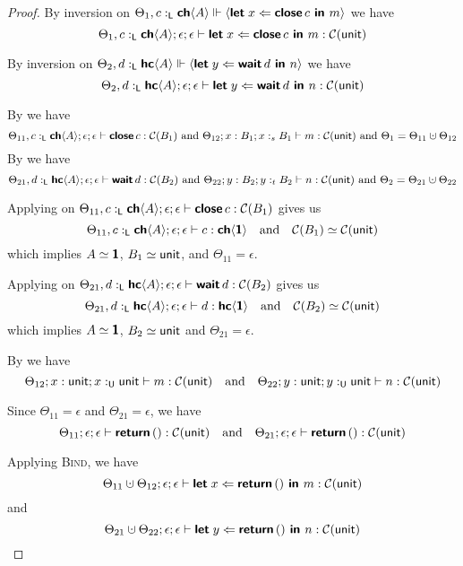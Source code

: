 \begin{proof}
  \noindent
  By inversion on $\Theta_1, c :_{\textsf{L}} {\textbf{\textsf{ch}}\langle{A}\rangle} \Vdash {\langle{\textbf{\textsf{let}}\;{x}\Leftarrow{\textbf{\textsf{close}}\,{c}}\textbf{\textsf{ in }}{m}}\rangle}$ we have
  $$\Theta_1, c :_{\textsf{L}} {\textbf{\textsf{ch}}\langle{A}\rangle} ; \epsilon ; \epsilon \vdash \textbf{\textsf{let}}\;{x}\Leftarrow{\textbf{\textsf{close}}\,{c}}\textbf{\textsf{ in }}{m} : \mathcal{C}({\textsf{unit}})$$

  \noindent
  By inversion on $\Theta_2, d :_{\textsf{L}} {\textbf{\textsf{hc}}\langle{A}\rangle} \Vdash {\langle{\textbf{\textsf{let}}\;{y}\Leftarrow{\textbf{\textsf{wait}}\,{d}}\textbf{\textsf{ in }}{n}}\rangle}$ we have
  $$\Theta_2, d :_{\textsf{L}} {\textbf{\textsf{hc}}\langle{A}\rangle} ; \epsilon ; \epsilon \vdash \textbf{\textsf{let}}\;{y}\Leftarrow{\textbf{\textsf{wait}}\,{d}}\textbf{\textsf{ in }}{n} : \mathcal{C}({\textsf{unit}})$$

  \noindent
  By  we have
  $$
    \Theta_{11}, c \tL \CH{A} ; \epsilon ; \epsilon \vdash \close{c} : \CM{B_1}
    \text{ and }
    \Theta_{12} ; x : B_1 ; x :_s B_1 \vdash m : \CM{\unit}
    \text{ and } {\Theta_1 = \Theta_{11} \dotcup \Theta_{12}}
  $$
  By  we have
  $$
    \Theta_{21}, d \tL \HC{A} ; \epsilon ; \epsilon \vdash \wait{d} : \CM{B_2}
    \text{ and }
    \Theta_{22}  ; y : B_2 ; y :_t B_2 \vdash n : \CM{\unit}
    \text{ and } {\Theta_2 = \Theta_{21} \dotcup \Theta_{22}}
  $$

  \noindent
  Applying  on 
  $\Theta_{11}, c :_{\textsf{L}} {\textbf{\textsf{ch}}\langle{A}\rangle} ; \epsilon ; \epsilon \vdash \textbf{\textsf{close}}\,{c} : \mathcal{C}({B_1})$ gives us
  $$
    \Theta_{11}, c :_{\textsf{L}} {\textbf{\textsf{ch}}\langle{A}\rangle} ; \epsilon ; \epsilon \vdash c : {\textbf{\textsf{ch}}\langle{\textbf{\textsf{1}}}\rangle}
    \quad\text{and}\quad
    \mathcal{C}({B_1}) \simeq \mathcal{C}({\textsf{unit}})
  $$
  which implies $A \simeq \textbf{\textsf{1}}$, $B_1 \simeq \textsf{unit}$, and $\Theta_{11} = \epsilon$.

  \noindent
  Applying  on
  $\Theta_{21}, d :_{\textsf{L}} {\textbf{\textsf{hc}}\langle{A}\rangle} ; \epsilon ; \epsilon \vdash \textbf{\textsf{wait}}\,{d} : \mathcal{C}({B_2})$ gives us
  $$
    \Theta_{21}, d :_{\textsf{L}} {\textbf{\textsf{hc}}\langle{A}\rangle} ; \epsilon ; \epsilon \vdash d : {\textbf{\textsf{hc}}\langle{\textbf{\textsf{1}}}\rangle}
    \quad\text{and}\quad
    \mathcal{C}({B_2}) \simeq \mathcal{C}({\textsf{unit}})
  $$
  which implies $A \simeq \textbf{\textsf{1}}$, $B_2 \simeq \textsf{unit}$ and $\Theta_{21} = \epsilon$.

  \noindent
  By  we have
  $$
    \Theta_{12} ; x : \textsf{unit} ; x :_{\textsf{U}} \textsf{unit} \vdash m : \mathcal{C}({\textsf{unit}})
    \quad\text{and}\quad
    \Theta_{22}  ; y : \textsf{unit} ; y :_{\textsf{U}} \textsf{unit} \vdash n : \mathcal{C}({\textsf{unit}})
  $$

  \noindent
  Since $\Theta_{11} = \epsilon$ and $\Theta_{21} = \epsilon$, we have
  $$
    \Theta_{11} ; \epsilon ; \epsilon \vdash \textbf{\textsf{return}}\,{{()}} : \mathcal{C}({\textsf{unit}})
    \quad\text{and}\quad
    \Theta_{21} ; \epsilon ; \epsilon \vdash \textbf{\textsf{return}}\,{{()}} : \mathcal{C}({\textsf{unit}})
  $$

  \noindent
  Applying \textsc{Bind}, we have
  $$\Theta_{11} \dotcup \Theta_{12} ; \epsilon ; \epsilon \vdash \letin{x}{\return{\ii}}{m} : \CM{\unit}$$
  and 
  $$\Theta_{21} \dotcup \Theta_{22} ; \epsilon ; \epsilon \vdash \letin{y}{\return{\ii}}{n} : \CM{\unit}$$


\end{proof}
